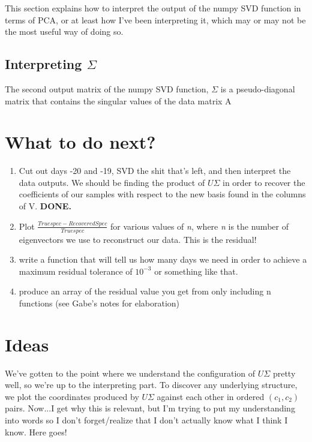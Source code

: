 \documentclass{article}
\begin{document}
This section explains how to interpret the output of the numpy SVD
function in terms of PCA, or at least how I've been interpreting it,
which may or may not be the most useful way of doing so.

\subsection{Interpreting $\Sigma$}
\label{sec:sigma}
The second output matrix of the numpy SVD function, $\Sigma$ is a
pseudo-diagonal matrix that contains the singular values of the data
matrix A

\section{What to do next?}
\label{sec:instructions}

\begin{enumerate}
\item Cut out days -20 and -19, SVD the shit that's left, and then
  interpret the data outputs.  We should be finding the product of
  $U\Sigma$ in order to recover the coefficients of our samples with
  respect to the new basis found in the columns of V. \textbf{DONE.}
\item Plot
  \begin{math}
    \frac{True spec - Recovered Spec}{Truespec}
  \end{math}
  for various values of \textit{n}, where \textit{n} is the number of
  eigenvectors we use to reconstruct our data.  This is the residual!
\item write a function that will tell us how many days we need in
  order to achieve a maximum residual tolerance of $10^{-3}$ or
  something like that.
\item produce an array of the residual value you get from only
  including n functions (see Gabe's notes for elaboration)
\end{enumerate}

\section{Ideas}
\label{sec:ideas}

We've gotten to the point where we understand the configuration of
$U\Sigma$ pretty well, so we're up to the interpreting part.  To
discover any underlying structure, we plot the coordinates produced by
$U\Sigma$ against each other in ordered $(c_{1},c_{2})$ pairs.
Now...I get why this is relevant, but I'm trying to put my
understanding into words so I don't forget/realize that I don't
actually know what I think I know.  Here goes!
\end{document}
